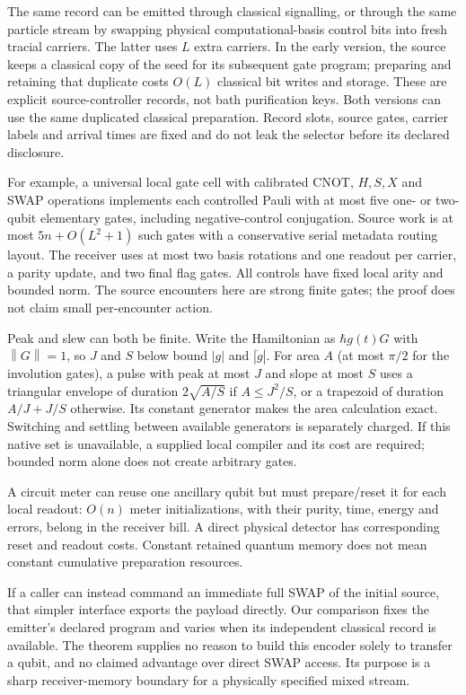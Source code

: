 \documentclass[11pt]{article}
\newcommand{\norm}[1]{\left\lVert#1\right\rVert}
\begin{document}
The same record can be emitted through classical signalling, or through the
same particle stream by swapping physical computational-basis control bits into
fresh tracial carriers. The latter uses $L$ extra carriers. In the early version,
the source keeps a classical copy of the seed for its subsequent gate program;
preparing and retaining that duplicate costs $O(L)$ classical bit writes and
storage. These are explicit source-controller records, not bath purification
keys. Both versions can use the same duplicated classical preparation. Record
slots, source gates, carrier labels and arrival times are fixed and do not leak
the selector before its declared disclosure.

For example, a universal local gate cell with calibrated CNOT, $H,S,X$ and
SWAP operations implements each controlled Pauli with at most five one- or
two-qubit elementary gates, including negative-control conjugation. Source
work is at most $5n+O(L^2+1)$ such gates with a conservative serial metadata
routing layout. The receiver uses at most two basis rotations and one readout
per carrier, a parity update, and two final flag gates. All controls have fixed
local arity and bounded norm. The source encounters here are strong finite
gates; the proof does not claim small per-encounter action.

Peak and slew can both be finite. Write the Hamiltonian as $\hbar g(t)G$
with $\norm G=1$, so $J$ and $S$ below bound $|g|$ and $|\dot g|$.
For area $A$ (at most $\pi/2$ for the involution gates), a pulse with
peak at most $J$ and slope at most $S$ uses a triangular envelope of duration
$2\sqrt{A/S}$ if $A\le J^2/S$, or a trapezoid of duration $A/J+J/S$ otherwise.
Its constant generator makes the area calculation exact. Switching and
settling between available generators is separately charged. If this native
set is unavailable, a supplied local compiler and its cost are required;
bounded norm alone does not create arbitrary gates.

A circuit meter can reuse one ancillary qubit but must prepare/reset it for
each local readout: $O(n)$ meter initializations, with their purity, time,
energy and errors, belong in the receiver bill. A direct physical detector
has corresponding reset and readout costs. Constant retained quantum memory
does not mean constant cumulative preparation resources.

If a caller can instead command an immediate full SWAP of the initial source,
that simpler interface exports the payload directly. Our comparison fixes the
emitter's declared program and varies when its independent classical record
is available. The theorem supplies no reason to build this encoder solely to
transfer a qubit, and no claimed advantage over direct SWAP access. Its purpose
is a sharp receiver-memory boundary for a physically specified mixed stream.
\end{document}
